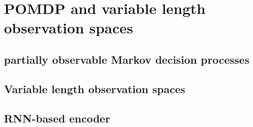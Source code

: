 \chapter{POMDP and variable length observation spaces}

\section{partially observable Markov decision processes}

\section{Variable length observation spaces}

\section{RNN-based encoder}